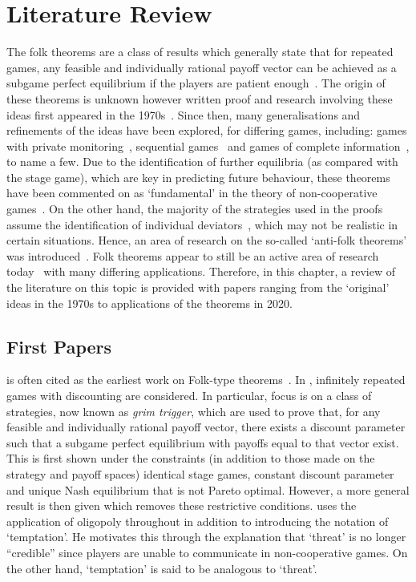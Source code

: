 \chapter{Literature Review}

The folk theorems are a class of results which generally state that for repeated
games, any feasible and individually rational payoff vector can be achieved as a
subgame perfect equilibrium if the players are patient enough~\cite{Li2019}. The
origin of these theorems is unknown however written proof and
research involving these ideas first appeared in the
1970s~\cite{Friedman1971, aumann1976long, Rubinstein1979}. Since then, many
generalisations and refinements of
the ideas have been explored, for differing games, including:
games with private monitoring~\cite{Matsushima2004, Hoerner2006, Peski2012}, sequential
games~\cite{Gossner1996, Bhaskar1998, Wen2002} and games of complete
information~\cite{Benoit_1985, Abreu1994, Bernergard2019}, to
name a few. Due to the identification of further equilibria (as compared with
the stage game), which are key in predicting future behaviour, these theorems
have been commented on as `fundamental' in the theory of non-cooperative
games~\cite{Hoerner2006, }. On the other hand, the majority of the strategies used in the
proofs assume the identification of individual deviators~\cite{Masso1989}, which may not
be realistic in certain situations. Hence, an area of research on the so-called
`anti-folk theorems' was introduced~\cite{Masso1989, Yoon2001, Peski2012}. Folk theorems appear to still be an
active area of research today~\cite{Ikeda2020, Parras2020, Wang2020} with many differing applications.
Therefore, in this chapter, a review of the literature on this topic is provided
with papers ranging from the `original' ideas in the 1970s to applications of
the theorems in 2020. 


\section{First Papers}\label{sec:First_Papers}
\cite{Friedman1971} is often cited as the earliest work on Folk-type
theorems~\cite{Abreu1994, }. In \cite{Friedman1971}, infinitely repeated games with
discounting are considered. In particular, focus is on a class of strategies,
now known as \emph{grim trigger}, which are used to prove that, for any feasible
and individually rational payoff vector, there exists a discount parameter such
that a subgame perfect equilibrium with payoffs equal to that vector exist. This
is first shown under the constraints (in addition to those made on the strategy
and payoff spaces) identical stage games, constant discount parameter and unique
Nash equilibrium that is not Pareto optimal. However, a more general result is
then given which removes these restrictive conditions. \cite{Friedman1971} uses
the application of oligopoly throughout in addition to introducing the notation
of `temptation'. He motivates this through the explanation that `threat' is no
longer ``credible'' since players are unable to communicate in non-cooperative
games. On the other hand, `temptation' is said to be analogous to `threat'.

